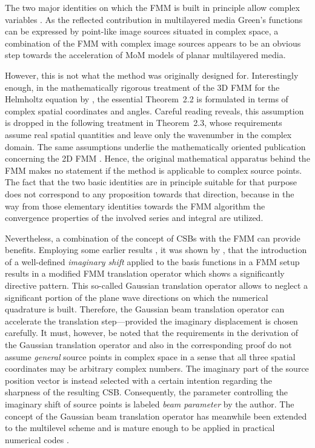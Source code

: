 The two major identities on which the \ac{FMM} is built in principle allow
complex variables \cite{Olver2010}.
As the reflected contribution in multilayered media Green's functions can
be expressed by point-like image sources situated in complex space,
a combination of the \ac{FMM} with complex image sources appears to be an
obvious step towards the acceleration of \ac{MoM} models of planar multilayered
media.

However, this is not what the method was originally designed for.
Interestingly enough, in the mathematically rigorous treatment of the 3D
\ac{FMM} for the Helmholtz equation by \textcite{Rokhlin1993}, the essential
Theorem~2.2 is formulated in terms of complex spatial coordinates and angles.
Careful reading reveals, this assumption is dropped in the following
treatment in Theorem~2.3, whose requirements assume real spatial quantities
and leave only the wavenumber in the complex domain.
The same assumptions underlie the mathematically oriented publication concerning
the 2D \ac{FMM} \cite{Rokhlin1990}.
Hence, the original mathematical apparatus behind the \ac{FMM} makes no
statement if the method is applicable to complex source points.
The fact that the two basic identities are in principle suitable for that
purpose does not correspond to any proposition towards that direction, because
in the way from those elementary identities towards the \ac{FMM} algorithm
the convergence properties of the involved series and integral are utilized.

Nevertheless, a combination of the concept of \acp{CSB} with the \ac{FMM} can
provide benefits.
Employing some earlier results \cite{Hansen2009}, it was shown by
\textcite{Hansen2013}, that the introduction of a well-defined
\emph{imaginary shift} applied to the basis functions in a \ac{FMM} setup
results in a modified \ac{FMM} translation operator which shows a significantly
directive pattern.
This so-called Gaussian translation operator allows to neglect a significant
portion of the plane wave directions on which the numerical quadrature is built.
Therefore, the Gaussian beam translation operator can accelerate the 
translation step---provided the imaginary displacement is chosen carefully.
It must, however, be noted that the requirements in the derivation of the
Gaussian translation operator and also in the corresponding proof 
\cite[Appendix]{Hansen2013} do not assume \emph{general} source points in
complex space in a sense that all three spatial coordinates may be arbitrary
complex numbers.
The imaginary part of the source position vector is instead selected with a
certain intention regarding the sharpness of the resulting \ac{CSB}.
Consequently, the parameter controlling the imaginary shift of source points
is labeled \emph{beam parameter} by the author.
The concept of the Gaussian beam translation operator has meanwhile been
extended to the multilevel scheme \cite{Borries2014} and is mature enough
to be applied in practical numerical codes \cite{eibert2021}.

